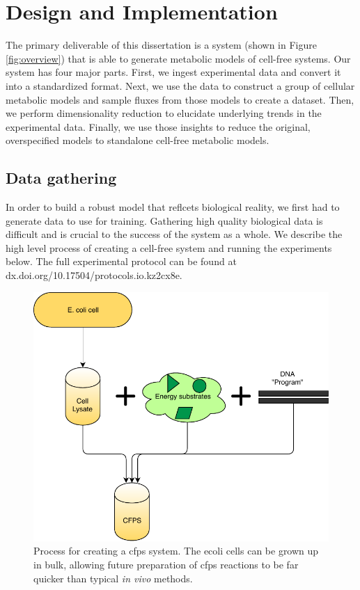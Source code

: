 \chapter{Design and Implementation} \label{chap:impl}


The primary deliverable of this dissertation is a system (shown in Figure \ref{fig:overview}) that is able to generate metabolic models of cell-free systems.
Our system has four major parts.
First, we ingest experimental data and convert it into a standardized format.
Next, we use the data to construct a group of cellular metabolic models and sample fluxes from those models to create a dataset.
Then, we perform dimensionality reduction to elucidate underlying trends in the experimental data.
Finally, we use those insights to reduce the original, overspecified models to standalone cell-free metabolic models.

\section{Data gathering}
In order to build a robust model that reflcets biological reality, we first had to generate data to use for training.
Gathering high quality biological data is difficult and is crucial to the success of the system as a whole.
We describe the high level process of creating a cell-free system and running the experiments below.
The full experimental protocol can be found at dx.doi.org/10.17504/protocols.io.kz2cx8e.

\begin{figure}[t!]
\begin{center}
\includegraphics{figs/CellFreeSetup.pdf}
\caption[Process for creating a \gls{cfps} system]{Process for creating a \gls{cfps} system.
The \gls{ecoli} cells can be grown up in bulk, allowing future preparation of \gls{cfps} reactions to be far quicker than typical \textit{in vivo} methods.
}
\end{center}
\label{fig:cfps}
\end{figure}

